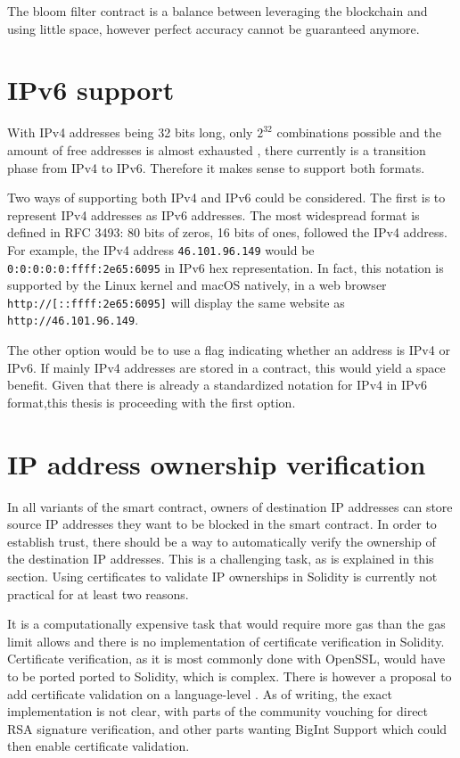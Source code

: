 The bloom filter contract is a balance between leveraging the blockchain and using little space, however perfect accuracy cannot be guaranteed anymore.

\section{IPv6 support}

With IPv4 addresses being 32 bits long, only $ 2^{32} $ combinations possible and the amount of free addresses is almost exhausted \cite{IPv4Exhaustion}, there currently is a transition phase from IPv4 to IPv6. Therefore it makes sense to support both formats.

Two ways of supporting both IPv4 and IPv6 could be considered.
The first is to represent IPv4 addresses as IPv6 addresses. The most widespread format is defined in RFC 3493: 80 bits of zeros, 16 bits of ones, followed the IPv4 address. For example, the IPv4 address \texttt{46.101.96.149} would be \texttt{0:0:0:0:0:ffff:2e65:6095} in IPv6 hex representation. In fact, this notation is supported by the Linux kernel and macOS natively, in a web browser \texttt{http://[::ffff:2e65:6095]} will display the same website as \texttt{http://46.101.96.149}.

The other option would be to use a flag indicating whether an address is IPv4 or IPv6. If mainly IPv4 addresses are stored in a contract, this would yield a space benefit.
Given that there is already a standardized notation for IPv4 in IPv6 format,this thesis is proceeding with the first option.

\section{IP address ownership verification}
In all variants of the smart contract, owners of destination IP addresses can store source IP addresses they want to be blocked in the smart contract. In order to establish trust, there should be a way to automatically verify the ownership of the destination IP addresses. This is a challenging task, as is explained in this section. Using certificates to validate IP ownerships in Solidity is currently not practical for at least two reasons.

It is a computationally expensive task that would require more gas than the gas limit allows and there is no implementation of certificate verification in Solidity. Certificate verification, as it is most commonly done with OpenSSL, would have to be ported ported to Solidity, which is complex.
There is however a proposal to add certificate validation on a language-level \cite{EIP74}. As of writing, the exact implementation is not clear, with parts of the community vouching for direct RSA signature verification, and other parts wanting BigInt Support which could then enable certificate validation.

